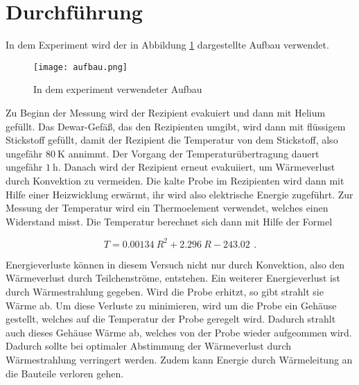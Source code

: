 \section{Durchführung}

In dem Experiment wird der in Abbildung \ref{fig:aufbau} dargestellte Aufbau
verwendet.

\begin{figure}[H]
  \centering
  \texttt{[image: aufbau.png]}
  \caption{In dem experiment verwendeter Aufbau}
  \label{fig:aufbau}
\end{figure}

Zu Beginn der Messung wird der Rezipient evakuiert und dann mit Helium gefüllt.
Das Dewar-Gefäß, das den Rezipienten umgibt, wird dann mit flüssigem
Stickstoff gefüllt, damit der Rezipient die Temperatur von dem Stickstoff, also
ungefähr $\SI{80}{\kelvin}$ annimmt. Der Vorgang der Temperaturübertragung
dauert ungefähr $\SI{1}{\hour}$. Danach wird der Rezipient erneut evakuiiert,
um Wärmeverlust durch Konvektion zu vermeiden. Die kalte Probe im Rezipienten
wird dann mit Hilfe einer Heizwicklung erwärmt, ihr wird also elektrische
Energie zugeführt. Zur Messung der Temperatur wird ein Thermoelement verwendet,
welches einen Widerstand misst. Die Temperatur berechnet sich dann mit Hilfe
der Formel

\begin{equation}
  T = \SI{0.00134}{} R^2 + \SI{2.296}{} R - \SI{243.02}{} \, .
\end{equation}

Energieverluste können in diesem Versuch nicht nur durch Konvektion, also
den Wärmeverlust durch Teilchenströme, entstehen. Ein weiterer Energieverlust
ist durch Wärmestrahlung gegeben. Wird die Probe erhitzt, so gibt strahlt sie
Wärme ab. Um diese Verluste zu minimieren, wird um die Probe ein Gehäuse
gestellt, welches auf die Temperatur der Probe geregelt wird. Dadurch strahlt
auch dieses Gehäuse Wärme ab, welches von der Probe wieder aufgeommen wird.
Dadurch sollte bei optimaler Abstimmung der Wärmeverlust durch Wärmestrahlung
verringert werden. Zudem kann Energie durch Wärmeleitung an die Bauteile
verloren gehen.

